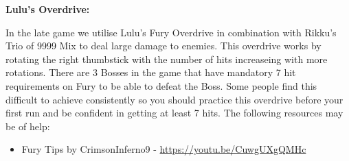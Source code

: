 \textbf{\large Lulu's Overdrive:}

\vspace{\baselineskip}

In the late game we utilise Lulu's Fury Overdrive in combination with Rikku's Trio of 9999 Mix to deal large damage to enemies. This overdrive works by rotating the right thumbstick with the number of hits increaseing with more rotations. There are 3 Bosses in the game that have mandatory 7 hit requirements on Fury to be able to defeat the Boss. Some people find this difficult to achieve consistently so you should practice this overdrive before your first run and be confident in getting at least 7 hits. The following resources may be of help:

\vspace{\baselineskip}

\begin{itemize}

	\item Fury Tips by CrimsonInferno9 - \url{https://youtu.be/CuwgUXgQMHc}

\end{itemize}

\newpage
